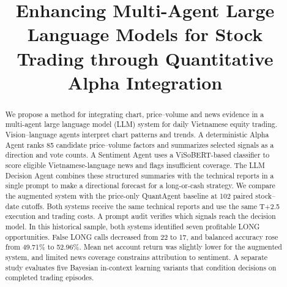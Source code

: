 \documentclass[preprint,12pt]{elsarticle}
\begin{document}
\begin{frontmatter}


\title{Enhancing Multi-Agent Large Language Models for Stock Trading through Quantitative Alpha Integration}







\begin{abstract}
We propose a method for integrating chart, price--volume and news
evidence in a multi-agent large language model (LLM) system for daily
Vietnamese equity trading. Vision--language agents interpret chart
patterns and trends. A deterministic Alpha Agent ranks 85 candidate
price--volume factors and summarizes selected signals as a direction
and vote counts. A Sentiment Agent uses a ViSoBERT-based classifier to
score eligible Vietnamese-language news and flags insufficient coverage.
The LLM Decision Agent combines these structured summaries with the
technical reports in a single prompt to make a directional forecast
for a long-or-cash strategy.
We compare the augmented system with the price-only QuantAgent baseline
at 102 paired stock--date cutoffs. Both systems receive the same
technical reports and use the same T+2.5 execution and trading costs.
A prompt audit verifies which signals reach the decision model.
In this historical sample, both systems identified seven profitable
LONG opportunities. False LONG calls decreased from 22 to 17, and
balanced accuracy rose from 49.71\% to 52.96\%. Mean net account return
was slightly lower for the augmented system, and limited news coverage
constrains attribution to sentiment. A separate study evaluates five
Bayesian in-context learning variants that condition decisions on
completed trading episodes.
\end{abstract}


\end{frontmatter}
\end{document}
